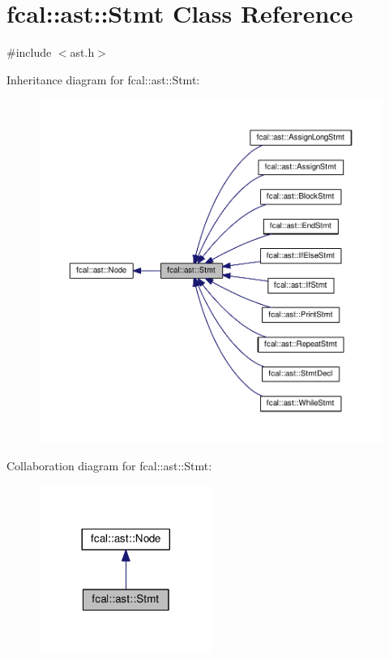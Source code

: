 \hypertarget{classfcal_1_1ast_1_1Stmt}{}\section{fcal\+:\+:ast\+:\+:Stmt Class Reference}
\label{classfcal_1_1ast_1_1Stmt}


{\ttfamily \#include $<$ast.\+h$>$}



Inheritance diagram for fcal\+:\+:ast\+:\+:Stmt\+:
\nopagebreak
\begin{figure}[H]
\begin{center}
\leavevmode
\includegraphics[width=350pt]{classfcal_1_1ast_1_1Stmt__inherit__graph}
\end{center}
\end{figure}


Collaboration diagram for fcal\+:\+:ast\+:\+:Stmt\+:
\nopagebreak
\begin{figure}[H]
\begin{center}
\leavevmode
\includegraphics[width=161pt]{classfcal_1_1ast_1_1Stmt__coll__graph}
\end{center}
\end{figure}

